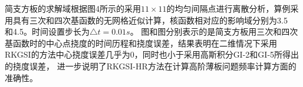\documentclass[11pt,a4paper]{article}
\begin{document}
\begin{figure}[!h]
\begin{floatrow}
\end{floatrow}
\end{figure}
简支方板的求解域根据图4所示的采用$11\times 11$的均匀间隔点进行离散分析，算例采用具有三次和四次基函数的无网格近似计算，核函数相对应的影响域分别为3.5\\和4.5。时间设置步长为$\triangle t=0.01s$。
图和图分别表示的是简支方板用三次和四次基函数时的中心点挠度的时间历程和挠度误差，结果表明在二维情况下采用RKGSI的方法中心挠度误差几乎为0，同时也小于采用高斯积分GI-2和GI-5所得出的挠度误差，
进一步说明了RKGSI-HR方法在计算高阶薄板问题频率计算方面的准确性。
\end{document}
